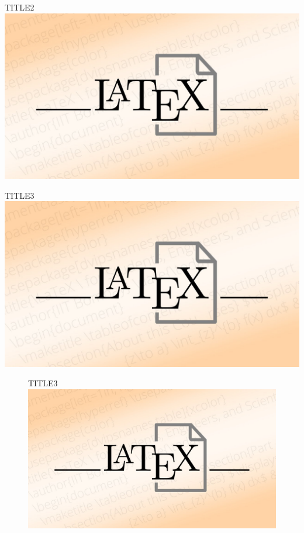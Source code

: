 \documentclass[12pt,a4paper]{article}
\begin{document}
\lipsum[4]

\qquad
\begin{myFIGlst}{TITLE2}{}
\includegraphics[scale=0.15]{LaTeX.jpg}
\end{myFIGlst}

\lipsum[4]

\qquad
\begin{myFIGlst}{TITLE3}{}
\includegraphics[scale=0.15]{LaTeX.jpg}
\end{myFIGlst}

\lipsum[4]

\begin{figure}
\centering
\begin{myFIGlst}{TITLE3}{}
	\includegraphics[scale=0.1]{LaTeX.jpg}
\end{myFIGlst}
\end{figure}
\end{document}
